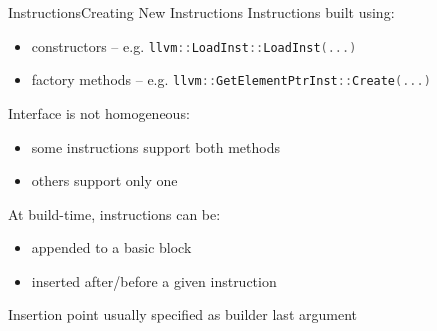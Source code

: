 \documentclass[10pt,mathserif]{beamer}
\newcommand{\cppinline}[1]{\lstinline[language=C++]!#1!}
\begin{document}
\begin{frame}{Instructions}{Creating New Instructions}
Instructions built using:

\begin{itemize}
\item constructors -- e.g. \cppinline{llvm::LoadInst::LoadInst(...)}
\item factory methods -- e.g. \cppinline{llvm::GetElementPtrInst::Create(...)}
\end{itemize}

Interface is not homogeneous:

\begin{itemize}
\item some instructions support both methods
\item others support only one
\end{itemize}

\vfill
At build-time, instructions can be:

\begin{itemize}
\item appended to a basic block
\item inserted after/before a given instruction
\end{itemize}

Insertion point usually specified as builder last argument
\end{frame}
\end{document}
